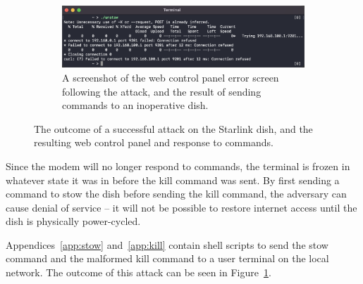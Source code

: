 \begin{figure}
\begin{subfigure}{.5779\textwidth}
        \centering\includegraphics[width=\textwidth]{img/unstow.png}
        \caption{A screenshot of the web control panel error screen following the attack, and the result of sending commands to an inoperative dish.}
    \end{subfigure}
\caption{The outcome of a successful attack on the Starlink dish, and the resulting web control panel and response to commands.}
\label{fig:attack-outcome}
\end{figure}

Since the modem will no longer respond to commands, the terminal is frozen in whatever state it was in before the kill command was sent.
By first sending a command to stow the dish before sending the kill command, the adversary can cause denial of service -- it will not be possible to restore internet access until the dish is physically power-cycled.

Appendices~\ref{app:stow} and~\ref{app:kill} contain shell scripts to send the stow command and the malformed kill command to a user terminal on the local network.
The outcome of this attack can be seen in Figure~\ref{fig:attack-outcome}.

